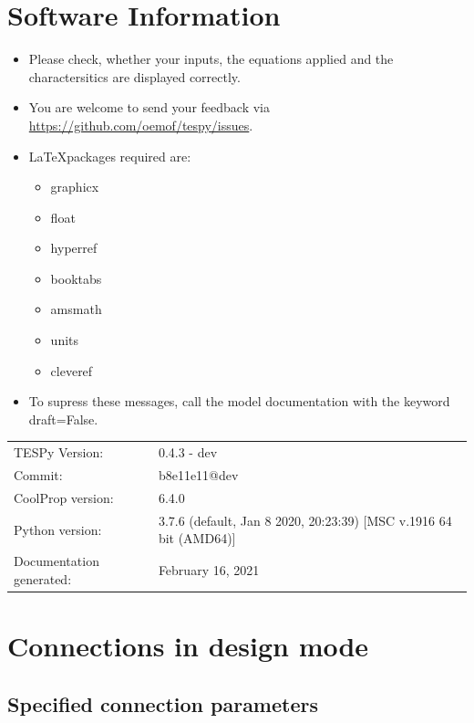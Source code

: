 \section*{Software Information}

\begin{itemize}
\item Please check, whether your inputs, the equations applied and the charactersitics are displayed correctly.
\item You are welcome to send your feedback via \url{https://github.com/oemof/tespy/issues}.
\item \LaTeX packages required are:
\begin{itemize}
\item graphicx
\item float
\item hyperref
\item booktabs
\item amsmath
\item units
\item cleveref
\end{itemize}
\item To supress these messages, call the model documentation with the keyword draft=False.
\end{itemize}

\begin{table}[H]
\begin{tabular}{ll}
TESPy Version:&0.4.3 - dev\\
Commit:&b8e11e11@dev\\
CoolProp version:&6.4.0\\
Python version:&3.7.6 (default, Jan  8 2020, 20:23:39) [MSC v.1916 64 bit (AMD64)]\\
Documentation generated:&February 16, 2021\\
\end{tabular}
\end{table}
\newpage\section{Connections in design mode}

\subsection{Specified connection parameters}

